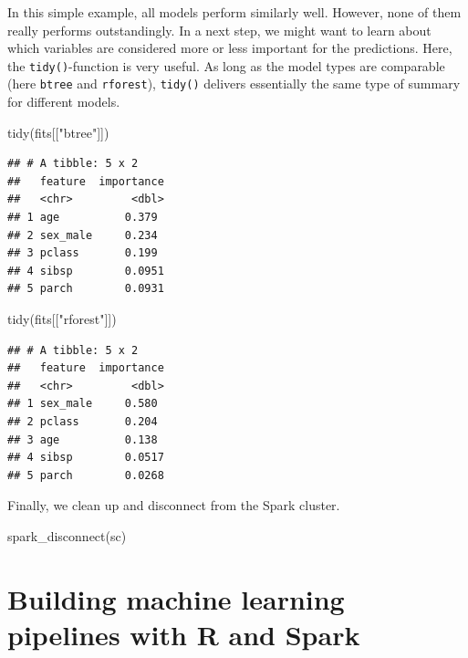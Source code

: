 \documentclass[
  12pt,
]{style/krantz}
\newenvironment{Shaded}{\begin{snugshade}}{\end{snugshade}}
\newcommand{\FunctionTok}[1]{\textcolor[rgb]{0.00,0.00,0.00}{#1}}
\newcommand{\NormalTok}[1]{#1}
\newcommand{\StringTok}[1]{\textcolor[rgb]{0.31,0.60,0.02}{#1}}
\begin{document}
In this simple example, all models perform similarly well. However, none of them really performs outstandingly. In a next step, we might want to learn about which variables are considered more or less important for the predictions. Here, the \texttt{tidy()}-function is very useful. As long as the model types are comparable (here \texttt{btree} and \texttt{rforest}), \texttt{tidy()} delivers essentially the same type of summary for different models.

\begin{Shaded}
\begin{Highlighting}[]
\FunctionTok{tidy}\NormalTok{(fits[[}\StringTok{"btree"}\NormalTok{]])}
\end{Highlighting}
\end{Shaded}

\begin{verbatim}
## # A tibble: 5 x 2
##   feature  importance
##   <chr>         <dbl>
## 1 age          0.379 
## 2 sex_male     0.234 
## 3 pclass       0.199 
## 4 sibsp        0.0951
## 5 parch        0.0931
\end{verbatim}

\begin{Shaded}
\begin{Highlighting}[]
\FunctionTok{tidy}\NormalTok{(fits[[}\StringTok{"rforest"}\NormalTok{]])}
\end{Highlighting}
\end{Shaded}

\begin{verbatim}
## # A tibble: 5 x 2
##   feature  importance
##   <chr>         <dbl>
## 1 sex_male     0.580 
## 2 pclass       0.204 
## 3 age          0.138 
## 4 sibsp        0.0517
## 5 parch        0.0268
\end{verbatim}

Finally, we clean up and disconnect from the Spark cluster.

\begin{Shaded}
\begin{Highlighting}[]
\FunctionTok{spark\_disconnect}\NormalTok{(sc)}
\end{Highlighting}
\end{Shaded}

\hypertarget{building-machine-learning-pipelines-with-r-and-spark}{%
\section{Building machine learning pipelines with R and Spark}\label{building-machine-learning-pipelines-with-r-and-spark}}
\end{document}
